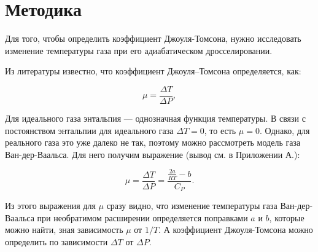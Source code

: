 \chapter{Методика}
\label{ch:methods}

Для того, чтобы определить коэффициент Джоуля-Томсона, нужно исследовать изменение температуры газа при его адиабатическом дросселировании.

Из литературы известно, что коэффициент Джоуля–Томсона определяется, как:

\begin{equation}
\mu = \frac{\Delta T}{\Delta P},
\end{equation}


Для идеального газа энтальпия — однозначная функция температуры. В связи с постоянством энтальпии для идеального газа $\Delta T = 0$, то есть $\mu = 0$. Однако, для реального газа это уже далеко не так, поэтому можно рассмотреть модель газа Ван-дер-Ваальса. Для него получим выражение (вывод см. в Приложении А.):

\begin{equation}
\mu = \frac{\Delta T}{\Delta P} = \frac{\frac{2a}{RT} - b}{C_P}.
\end{equation}

Из этого выражения для $\mu$ сразу видно, что изменение температуры газа Ван-дер-Ваальса при необратимом расширении определяется поправками $a$ и $b$, которые можно найти, зная зависимость $\mu$ от $1/T$. А коэффициент Джоуля-Томсона можно определить по зависимости $\Delta T$ от $\Delta P$.

